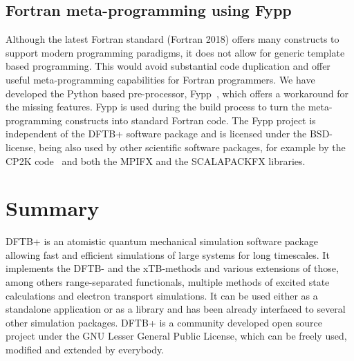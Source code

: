 \documentclass[reprint,onecolumn,superscriptaddress]{revtex4-1}
\newcommand{\dftbp}{DFTB+}
\begin{document}
\subsection{Fortran meta-programming using Fypp}
Although the latest Fortran standard (Fortran 2018) offers many constructs to
support modern programming paradigms, it does not allow for generic template
based programming. This would avoid substantial code duplication and offer
useful meta-programming capabilities for Fortran programmers. We have developed
the Python based pre-processor, Fypp~\cite{fypp-repo}, which offers a workaround
for the missing features. Fypp is used during the build process to
turn the meta-programming constructs into standard Fortran code. The
Fypp project is independent of the \dftbp{} software package and is licensed
under the BSD-license, being also used by other scientific software packages,
for example by the CP2K code~\cite{cp2k-repo} and both the MPIFX and the
SCALAPACKFX libraries.


\section{Summary}

\dftbp{} is an atomistic quantum mechanical simulation software package allowing
fast and efficient simulations of large systems for long timescales. It
implements the DFTB- and the xTB-methods and various extensions of those, among
others range-separated functionals, multiple methods of excited state
calculations and electron transport simulations. It can be used either as a
standalone application or as a library and has been already interfaced to
several other simulation packages. \dftbp{} is a community developed open source
project under the GNU Lesser General Public License, which can be freely used,
modified and extended by everybody.
\end{document}

